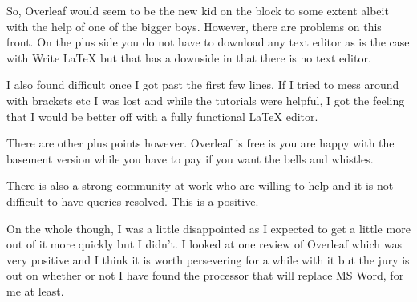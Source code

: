 \documentclass[paper=a4, fontsize=11pt]{scrartcl} %
\numberwithin{equation}{section} %
\numberwithin{figure}{section} %
\numberwithin{table}{section} %
\begin{document}
So, Overleaf would seem to be the new kid on the block to some extent albeit with the help of one of the bigger boys. However, there are problems on this front. On the plus side you do not have to download any text editor as is the case with Write LaTeX but that has a downside in that there is no text editor.

I also found difficult once I got past the first few lines. If I tried to mess around with brackets etc I was lost and while the tutorials were helpful, I got the feeling that I would be better off with a fully functional LaTeX editor.

There are other plus points however. Overleaf is free is you are happy with the basement version while you have to pay if you want the bells and whistles. 

There is also a strong community at work who are willing to help and it is not difficult to have queries resolved. This is a positive. 

On the whole though, I was a little disappointed as I expected to get a little more out of it more quickly but I didn't. I looked at one review of Overleaf which was very positive and I think it is worth persevering for a while with it but the jury is out on whether or not I have found the processor that will replace MS Word, for me at least. 




\end{document}
